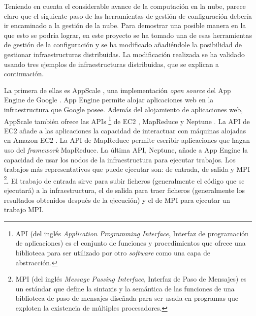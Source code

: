 Teniendo en cuenta el considerable avance de la computación en la nube, parece claro que el siguiente paso de las herramientas de gestión de configuración debería ir encaminado a la gestión de la nube. Para demostrar una posible manera en la que esto se podría lograr, en este proyecto se ha tomado una de esas herramientas de gestión de la configuración y se ha modificado añadiéndole la posibilidad de gestionar infraestructuras distribuidas. La modificación realizada se ha validado usando tres ejemplos de infraestructuras distribuidas, que se explican a continuación.

La primera de ellas es AppScale \cite{appscale}, una implementación \emph{open source} del App Engine de Google \cite{appengine}. App Engine permite alojar aplicaciones web en la infraestructura que Google posee. Además del alojamiento de aplicaciones web, AppScale también ofrece las APIs \footnote[1]{API (del inglés \emph{Application Programming Interface}, Interfaz de programación de aplicaciones) es el conjunto de funciones y procedimientos que ofrece una biblioteca para ser utilizado por otro \emph{software} como una capa de abstracción.} de EC2 \cite{appscale-ec2}, MapReduce \cite{appscale-mapreduce} y Neptune \cite{appscale-neptune}. La API de EC2 añade a las aplicaciones la capacidad de interactuar con máquinas alojadas en Amazon EC2 \cite{amazon-ec2}. La API de MapReduce permite escribir aplicaciones que hagan uso del \emph{framework} MapReduce. La última API, Neptune, añade a App Engine la capacidad de usar los nodos de la infraestructura para ejecutar trabajos. Los trabajos más representativos que puede ejecutar son: de entrada, de salida y MPI \footnote[2]{MPI (del inglés \emph{Message Passing Interface}, Interfaz de Paso de Mensajes) es un estándar que define la sintaxis y la semántica de las funciones de una biblioteca de paso de mensajes diseñada para ser usada en programas que exploten la existencia de múltiples procesadores.}. El trabajo de entrada sirve para subir ficheros (generalmente el código que se ejecutará) a la infraestructura, el de salida para traer ficheros (generalmente los resultados obtenidos después de la ejecución) y el de MPI para ejecutar un trabajo MPI.


